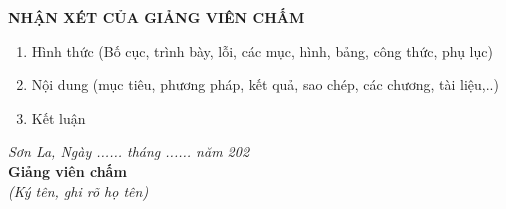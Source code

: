 \documentclass[12pt]{article}
\begin{document}
	\newpage
	
	\newpage
	\begin{center}
		\textbf{NHẬN XÉT CỦA GIẢNG VIÊN CHẤM}
	\end{center}
	
	\vspace{1cm}
	
	\begin{enumerate}
		\item Hình thức (Bố cục, trình bày, lỗi, các mục, hình, bảng, công thức, phụ lục)
		
		\vspace{3cm}
		
		\item Nội dung (mục tiêu, phương pháp, kết quả, sao chép, các chương, tài liệu,..)
		
		\vspace{3cm}
		
		\item Kết luận
		
		\vspace{3cm}
	\end{enumerate}
	
	\vspace{1cm}
	
	\begin{flushright}
		\textit{Sơn La, Ngày ...... tháng ...... năm 202}\\[0.5cm]
		\textbf{Giảng viên chấm}\\[0.3cm]
		\textit{(Ký tên, ghi rõ họ tên)}
	\end{flushright}
	\newpage
	
	\tableofcontents
	\thispagestyle{empty}
	\clearpage
	\newpage
	
\end{document}
